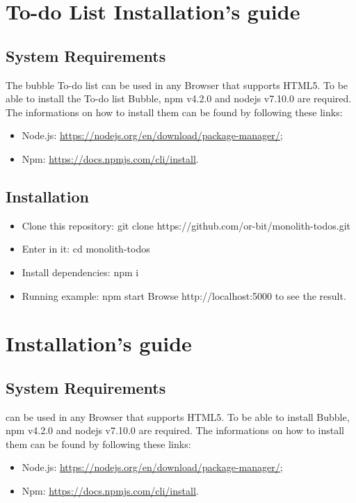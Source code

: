 \section{To-do List Installation's guide}

\subsection{System Requirements}
The bubble To-do list can be used in any Browser that supports HTML5. To be able to install the To-do list Bubble, npm v4.2.0 and nodejs v7.10.0 are required. The informations on how to install them can be found by following these links:
\begin{itemize}
	\item Node.js: \url{https://nodejs.org/en/download/package-manager/};
	\item Npm: \url{https://docs.npmjs.com/cli/install}.
\end{itemize}

\subsection{Installation}
\begin{itemize}
\item Clone this repository: git clone https://github.com/or-bit/monolith-todos.git
\item Enter in it: cd monolith-todos
\item Install dependencies: npm i
\item Running example: npm start Browse http://localhost:5000 to see the result.
\end{itemize}

\section{\DemoName{} Installation's guide}

\subsection{ \DemoName{} System Requirements}
\DemoName{} can be used in any Browser that supports HTML5. 
To be able to install \DemoName{} Bubble, npm v4.2.0 and nodejs v7.10.0 are required. The informations on how to install them can be found by following these links:
\begin{itemize}
	\item Node.js: \url{https://nodejs.org/en/download/package-manager/};
	\item Npm: \url{https://docs.npmjs.com/cli/install}.
\end{itemize}

